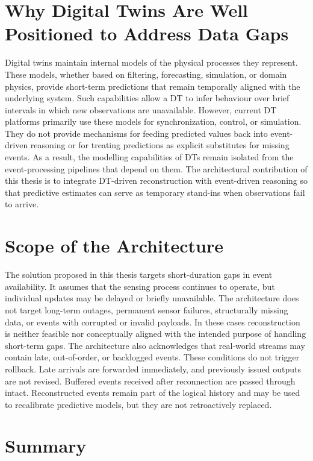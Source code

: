\section{Why Digital Twins Are Well Positioned to Address Data Gaps}

Digital twins maintain internal models of the physical processes they represent. These models, whether based on filtering, forecasting, simulation, or domain physics, provide short-term predictions that remain temporally aligned with the underlying system. Such capabilities allow a DT to infer behaviour over brief intervals in which new observations are unavailable. However, current DT platforms primarily use these models for synchronization, control, or simulation. They do not provide mechanisms for feeding predicted values back into event-driven reasoning or for treating predictions as explicit substitutes for missing events. As a result, the modelling capabilities of DTs remain isolated from the event-processing pipelines that depend on them. The architectural contribution of this thesis is to integrate DT-driven reconstruction with event-driven reasoning so that predictive estimates can serve as temporary stand-ins when observations fail to arrive.

\section{Scope of the Architecture}

The solution proposed in this thesis targets short-duration gaps in event availability. It assumes that the sensing process continues to operate, but individual updates may be delayed or briefly unavailable. The architecture does not target long-term outages, permanent sensor failures, structurally missing data, or events with corrupted or invalid payloads. In these cases reconstruction is neither feasible nor conceptually aligned with the intended purpose of handling short-term gaps.
The architecture also acknowledges that real-world streams may contain late, out-of-order, or backlogged events. These conditions do not trigger rollback. Late arrivals are forwarded immediately, and previously issued outputs are not revised. Buffered events received after reconnection are passed through intact. Reconstructed events remain part of the logical history and may be used to recalibrate predictive models, but they are not retroactively replaced.

\section{Summary}

